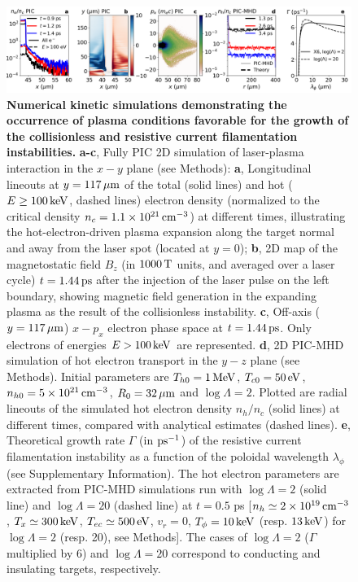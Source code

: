 \documentclass[aps,twocolumn,showpacs,superscriptaddress]{revtex4}
\begin{document}
\begin{figure}[tbh!]
\includegraphics[scale=0.4]{Figure_3.png}
\caption{
\textbf{Numerical kinetic simulations demonstrating the occurrence of plasma conditions favorable for the growth of the collisionless and resistive current filamentation instabilities.}
\textbf{a-c}, Fully PIC 2D simulation of laser-plasma interaction in the $x-y$ plane (see Methods): 
\textbf{a}, Longitudinal lineouts at $y=117\,\rm \mu m$ of the total (solid lines) and hot ($E \ge 100\,\rm keV$, dashed lines) electron density (normalized to the critical density $n_c =1.1\times 10^{21}\,\rm cm^{-3}$) at different times, illustrating the hot-electron-driven plasma expansion along the target normal and away from the laser spot (located at $y=0$);
\textbf{b}, 2D map of the magnetostatic field $B_z$ (in $1000\,\rm T$ units, and averaged over a laser cycle)
$t =1.44\,\rm ps$ after the injection of the laser pulse on the left boundary, showing magnetic field generation in the expanding plasma as the result of the collisionless instability.
\textbf{c}, Off-axis ($y = 117\,\rm \mu m$) $x-p_x$ electron phase space at $t =1.44\,\rm ps$. Only electrons of energies $E>100\,\rm keV$ are represented.
\textbf{d}, 2D PIC-MHD simulation of hot electron transport in the $y-z$ plane (see Methods). Initial parameters are $T_{h0} = 1\,\rm MeV$, $T_{c0} = 50\,\rm eV$, $n_{h0} = 5 \times 10^{21}\,\rm cm^{-3}$, $R_0 = 32\,\rm \mu m$ and $\log \Lambda =2$. Plotted are radial lineouts of the simulated hot electron density $n_h/n_c$ (solid lines) at different times, compared with analytical estimates (dashed lines).
\textbf{e}, Theoretical growth rate $\Gamma$ (in $\rm ps^{-1}$) of the resistive current filamentation instability as a function of the poloidal wavelength $\lambda_\phi$ (see Supplementary Information). The hot electron parameters are extracted from PIC-MHD simulations run with $\log \Lambda = 2$ (solid line) and $\log \Lambda = 20$ (dashed line) at $t=0.5$ ps [$n_h \simeq 2\times 10^{19}\,\rm cm^{-3}$, $T_x \simeq 300\,\rm keV$, $T_{ec} \simeq 500\,\rm eV$, $v_r=0$,  $T_\phi = 10\,\rm keV$ (resp. $13\,\rm keV$) for $\log \Lambda =2$ (resp. 20), see Methods]. The cases of $\log \Lambda = 2$ ($\Gamma$ multiplied by 6) and $\log \Lambda = 20$ correspond to conducting and insulating targets, respectively.}
\label{fig:pic} 
\end{figure}
\end{document}
